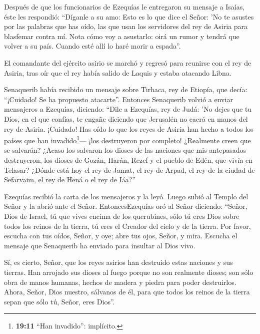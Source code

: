  Después de que los funcionarios de Ezequías le entregaron
su mensaje a Isaías,  éste les respondió: ``Díganle a su
amo: Esto es lo que dice el Señor: 'No te asustes por las palabras que
has oído, las que usan los servidores del rey de Asiria para blasfemar
contra mí.  Nota cómo voy a asustarlo: oirá un rumor y
tendrá que volver a su país. Cuando esté allí lo haré morir a espada''.

 El comandante del ejército asirio se marchó y regresó para
reunirse con el rey de Asiria, tras oír que el rey había salido de
Laquis y estaba atacando Libna.

 Senaquerib había recibido un mensaje sobre Tirhaca, rey de
Etiopía, que decía: ``¡Cuidado! Se ha propuesto atacarte''. Entonces
Senaquerib volvió a enviar mensajeros a Ezequías, diciendo:
 ``Dile a Ezequías, rey de Judá: 'No dejes que tu Dios, en
el que confías, te engañe diciendo que Jerusalén no caerá en manos del
rey de Asiria.  ¡Cuidado! Has oído lo que los reyes de
Asiria han hecho a todos los países que han invadido\footnote{\textbf{19:11}
  ``Han invadido'': implícito.}--- ¡los destruyeron por completo!
¿Realmente creen que se salvarán?  ¿Acaso los salvaron los
dioses de las naciones que mis antepasados destruyeron, los dioses de
Gozán, Harán, Rezef y el pueblo de Edén, que vivía en Telasar?
 ¿Dónde está hoy el rey de Jamat, el rey de Arpad, el rey
de la ciudad de Sefarvaim, el rey de Hená o el rey de Iáa?''

 Ezequías recibió la carta de los mensajeros y la leyó.
Luego subió al Templo del Señor y la abrió ante el Señor. 
EntoncesEzequías oró al Señor diciendo: ``Señor, Dios de Israel, tú que
vives encima de los querubines, sólo tú eres Dios sobre todos los reinos
de la tierra, tú eres el Creador del cielo y de la tierra. 
Por favor, escucha con tus oídos, Señor, y oye; abre tus ojos, Señor, y
mira. Escucha el mensaje que Senaquerib ha enviado para insultar al Dios
vivo.

 Sí, es cierto, Señor, que los reyes asirios han destruido
estas naciones y sus tierras.  Han arrojado sus dioses al
fuego porque no son realmente dioses; son sólo obra de manos humanas,
hechos de madera y piedra para poder destruirlos.  Ahora,
Señor, Dios nuestro, sálvanos de él, para que todos los reinos de la
tierra sepan que sólo tú, Señor, eres Dios''.

